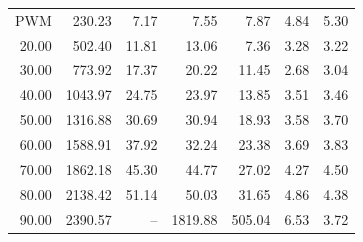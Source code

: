 \begin{tabular}{@{}rrrrrrr@{}}
\toprule
PWM %
\midrule
10.00 & 230.23 & 7.17 & 7.55 & 7.87 & 4.84 & 5.30 \\
20.00 & 502.40 & 11.81 & 13.06 & 7.36 & 3.28 & 3.22 \\
30.00 & 773.92 & 17.37 & 20.22 & 11.45 & 2.68 & 3.04 \\
40.00 & 1043.97 & 24.75 & 23.97 & 13.85 & 3.51 & 3.46 \\
50.00 & 1316.88 & 30.69 & 30.94 & 18.93 & 3.58 & 3.70 \\
60.00 & 1588.91 & 37.92 & 32.24 & 23.38 & 3.69 & 3.83 \\
70.00 & 1862.18 & 45.30 & 44.77 & 27.02 & 4.27 & 4.50 \\
80.00 & 2138.42 & 51.14 & 50.03 & 31.65 & 4.86 & 4.38 \\
90.00 & 2390.57 & -- & 1819.88 & 505.04 & 6.53 & 3.72 \\
\bottomrule
\end{tabular}
